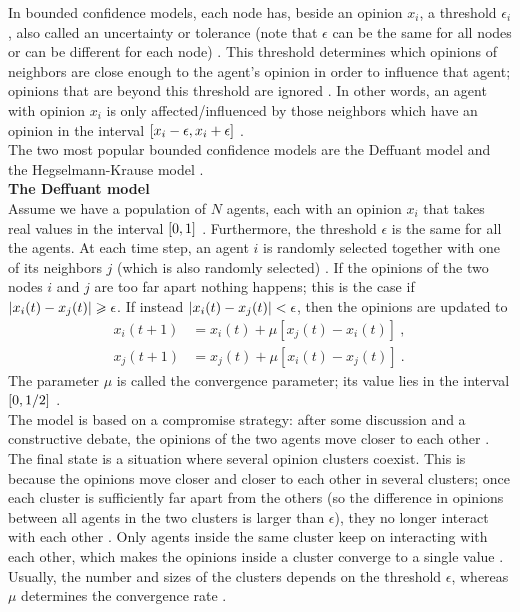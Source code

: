 \documentclass[11 pt , letterpaper , twoside , openright]{book}
\begin{document}
In bounded confidence models, each node has, beside an opinion $x_i$, a threshold $\epsilon_i$, also called an uncertainty or tolerance (note that $\epsilon$ can be the same for all nodes or can be different for each node) \cite{Castellano2009}\cite{Deffuant2006}. This threshold determines which opinions of neighbors are close enough to the agent's opinion in order to influence that agent; opinions that are beyond this threshold are ignored \cite{Deffuant2006}. In other words, an agent with opinion $x_i$ is only affected/influenced by those neighbors which have an opinion in the interval $\interval{x_i-\epsilon}{x_i+\epsilon}$ \cite{Castellano2009}. \\
The two most popular bounded confidence models are the Deffuant model and the Hegselmann-Krause model \cite{Castellano2009}. \\
\newline
\textbf{The Deffuant model}\\
\newline
Assume we have a population of $N$ agents, each with an opinion $x_i$ that takes real values in the interval $\interval{0}{1}$ \cite{Castellano2009}. Furthermore, the threshold $\epsilon$ is the same for all the agents. At each time step, an agent $i$ is randomly selected together with one of its neighbors $j$ (which is also randomly selected) \cite{Castellano2009}. If the opinions of the two nodes $i$ and $j$ are too far apart nothing happens; this is the case if $\abs{x_i(t) - x_j(t)} \geqslant \epsilon$. If instead $\abs{x_i(t) - x_j(t)} < \epsilon$, then the opinions are updated to \cite{Castellano2009}\cite{Deffuant2000}
\begin{equation}
\begin{split}
	x_i(t+1) &= x_i(t) + \mu [x_j(t) - x_i(t)] \ ,\\
	x_j(t+1) &= x_j(t) + \mu [x_i(t) - x_j(t)] \ .
\end{split}
\end{equation}
The parameter $\mu$ is called the convergence parameter; its value lies in the interval $\interval{0}{1/2}$ \cite{Castellano2009}. \\
The model is based on a compromise strategy: after some discussion and a constructive debate, the opinions of the two agents move closer to each other \cite{Castellano2009}. \\
The final state is a situation where several opinion clusters coexist. This is because the opinions move closer and closer to each other in several clusters; once each cluster is sufficiently far apart from the others (so the difference in opinions between all agents in the two clusters is larger than $\epsilon$), they no longer interact with each other \cite{Castellano2009}. Only agents inside the same cluster keep on interacting with each other, which makes the opinions inside a cluster converge to a single value \cite{Castellano2009}. Usually, the number and sizes of the clusters depends on the threshold $\epsilon$, whereas $\mu$ determines the convergence rate \cite{Castellano2009}.\\
\end{document}
